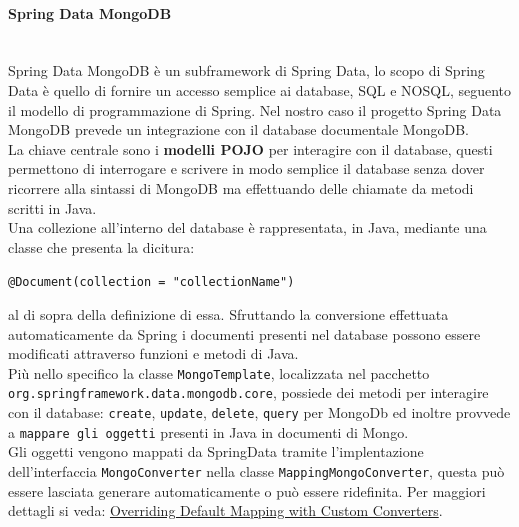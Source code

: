 \paragraph{Spring Data MongoDB}\mbox{}\\
\label{sec:DataMongoDB}
Spring Data MongoDB è un subframework di Spring Data, lo scopo di Spring Data è quello di fornire un accesso semplice ai database, SQL e NOSQL, seguento il modello di programmazione di Spring.
Nel nostro caso il progetto Spring Data MongoDB prevede un integrazione con il database documentale MongoDB.\\
La chiave centrale sono i {\textbf{modelli POJO}} per interagire con il database, questi permettono di interrogare e scrivere in modo semplice
il database senza dover ricorrere alla sintassi di MongoDB ma effettuando delle chiamate da metodi scritti in Java.\\ 
Una collezione all'interno del database è rappresentata, in Java, mediante una classe che presenta la dicitura:
\begin{center}
	\texttt{@Document(collection = "collectionName")}
\end{center}  
al di sopra della definizione di essa. Sfruttando la conversione effettuata automaticamente da Spring i documenti presenti nel database possono essere modificati attraverso funzioni e metodi di Java.\\
Più nello specifico la classe \texttt{MongoTemplate}, localizzata nel pacchetto \texttt{org.springframework.data.mongodb.core}, possiede dei metodi per interagire con il database: \texttt{create}, \texttt{update}, \texttt{delete}, \texttt{query} per MongoDb ed inoltre provvede a \texttt{mappare gli oggetti} presenti in Java in documenti di Mongo.\\ 
Gli oggetti vengono mappati da SpringData tramite l'implentazione dell'interfaccia \texttt{MongoConverter} nella
classe \texttt{MappingMongoConverter}, questa può essere lasciata generare automaticamente o può essere ridefinita. Per maggiori dettagli si veda: \href{https://docs.spring.io/spring-data/mongodb/docs/2.1.5.RELEASE/reference/html/#mongo.custom-converters}{Overriding Default Mapping with Custom Converters}.
